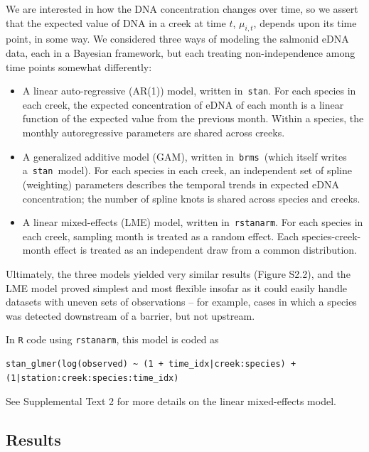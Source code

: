 \documentclass[
]{article}
\begin{document}
We are interested in how the DNA concentration changes over time, so we
assert that the expected value of DNA in a creek at time \(t\),
\(\mu_{i,t}\), depends upon its time point, in some way. We considered
three ways of modeling the salmonid eDNA data, each in a Bayesian
framework, but each treating non-independence among time points somewhat
differently:

\begin{itemize}
\item
  A linear auto-regressive (AR(1)) model, written in~\texttt{stan}. For
  each species in each creek, the expected concentration of eDNA of each
  month is a linear function of the expected value from the previous
  month. Within a species, the monthly autoregressive parameters are
  shared across creeks.
\item
  A generalized additive model (GAM), written in~\texttt{brms}~(which
  itself writes a~\texttt{stan}~model). For each species in each creek,
  an independent set of spline (weighting) parameters describes the
  temporal trends in expected eDNA concentration; the number of spline
  knots is shared across species and creeks.
\item
  A linear mixed-effects (LME) model, written in~\texttt{rstanarm}. For
  each species in each creek, sampling month is treated as a random
  effect. Each species-creek-month effect is treated as an independent
  draw from a common distribution.~
\end{itemize}

Ultimately, the three models yielded very similar results (Figure S2.2),
and the LME model proved simplest and most flexible insofar as it could
easily handle datasets with uneven sets of observations -- for example,
cases in which a species was detected downstream of a barrier, but not
upstream.

In \texttt{R} code using \texttt{rstanarm}, this model is coded as

\begin{verbatim}
stan_glmer(log(observed) ~ (1 + time_idx|creek:species) + (1|station:creek:species:time_idx)
\end{verbatim}

See Supplemental Text 2 for more details on the linear mixed-effects
model. ~

\hypertarget{results}{%
\subsection{Results}\label{results}}
\end{document}
